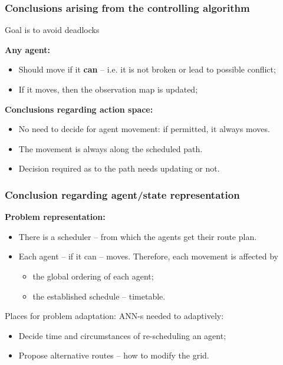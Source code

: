 \documentclass[12pt,aspectratio=169]{beamer}
\begin{document}
\begin{frame}[t]
  \frametitle{Conclusions arising from the controlling algorithm}

  \vspace*{-.4cm}\hfill
  \begin{minipage}{.4\linewidth}
  \begin{block}{Goal is to \alert{avoid deadlocks}}
  \end{block}
  \end{minipage}

  \vfill
  \textbf{Any agent:}
  \begin{itemize}
  \item \alert{Should move} if it \alert{\bfseries can} -- i.e. it is not broken or lead to possible conflict;
  \vfill
  \item \alert{If it moves}, then the observation map \alert{is updated};
  \end{itemize}
  
  \vfill
  \vfill

\textbf{Conclusions regarding action space:}

\begin{itemize}
  \vfill
  \item No need to decide for agent movement: if permitted, it \alert{always} moves.
  \vfill
  \item The movement is always \alert{along the scheduled path}.
  \vfill
  \item Decision required as to the path needs updating or not.
\end{itemize}

\end{frame}

\begin{frame}[t]
  \frametitle{Conclusion regarding agent/state representation}

\textbf{Problem representation:}
\begin{itemize}
\item There is a \alert{scheduler} -- from which the agents get their route plan.
\item Each agent -- if it can -- moves.
  Therefore, each movement is affected by
  \begin{itemize}
  \item the \alert{global ordering} of each agent;
  \item the established schedule -- timetable.
  \end{itemize}
\end{itemize}

\vfill
\begin{alertblock}{Places for problem adaptation:}
  \alert{ANN-s needed} to adaptively:
  \begin{itemize}
  \item Decide time and circumstances \alert{of re-scheduling} an agent;
  \item Propose \alert{alternative routes} -- how to \alert{modify the grid}.
  \end{itemize}
\end{alertblock}

\end{frame}
\end{document}
